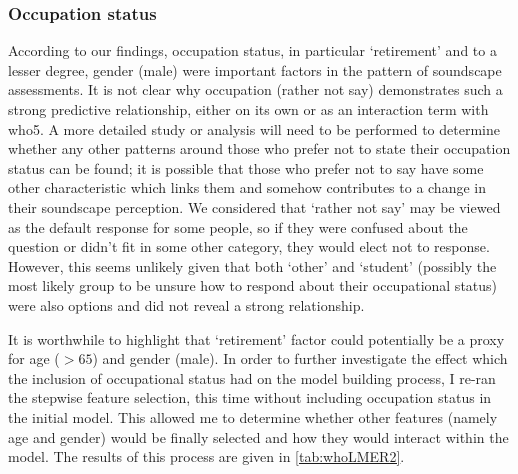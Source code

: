 \subsubsection*{Occupation status}
According to our findings, occupation status, in particular `retirement' and to a lesser degree, gender (male) were important factors in the pattern of soundscape assessments. It is not clear why occupation (rather not say) demonstrates such a strong predictive relationship, either on its own or as an interaction term with \gls{who5}. A more detailed study or analysis will need to be performed to determine whether any other patterns around those who prefer not to state their occupation status can be found; it is possible that those who prefer not to say have some other characteristic which links them and somehow contributes to a change in their soundscape perception. We considered that `rather not say' may be viewed as the default response for some people, so if they were confused about the question or didn't fit in some other category, they would elect not to response. However, this seems unlikely given that both `other' and `student' (possibly the most likely group to be unsure how to respond about their occupational status) were also options and did not reveal a strong relationship.

It is worthwhile to highlight that `retirement' factor could potentially be a proxy for age ($>65$) and gender (male). In order to further investigate the effect which the inclusion of occupational status had on the model building process, I re-ran the stepwise feature selection, this time without including occupation status in the initial model. This allowed me to determine whether other features (namely age and gender) would be finally selected and how they would interact within the model. The results of this process are given in \cref{tab:whoLMER2}.

